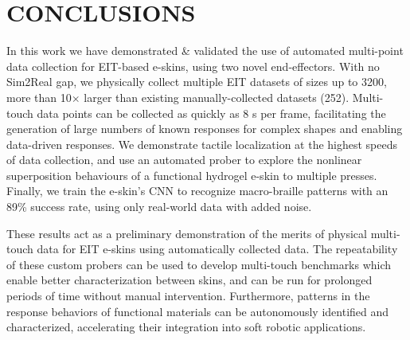 \section{CONCLUSIONS}
In this work we have demonstrated \& validated the use of automated multi-point data collection for EIT-based e-skins, using two novel end-effectors. With no Sim2Real gap, we physically collect multiple EIT datasets of sizes up to 3200, more than 10$\times$ larger than existing manually-collected datasets (252). Multi-touch data points can be collected as quickly as 8 s per frame, facilitating the generation of large numbers of known responses for complex shapes and enabling data-driven responses. We demonstrate tactile localization at the highest speeds of data collection, and use an automated prober to explore the nonlinear superposition behaviours of a functional hydrogel e-skin to multiple presses. Finally, we train the e-skin's CNN to recognize macro-braille patterns with an 89\% success rate, using only real-world data with added noise.

These results act as a preliminary demonstration of the merits of physical multi-touch data for EIT e-skins using automatically collected data. The repeatability of these custom probers can be used to develop multi-touch benchmarks which enable better characterization between skins, and can be run for prolonged periods of time without manual intervention. Furthermore, patterns in the response behaviors of functional materials can be autonomously identified and characterized, accelerating their integration into soft robotic applications.
